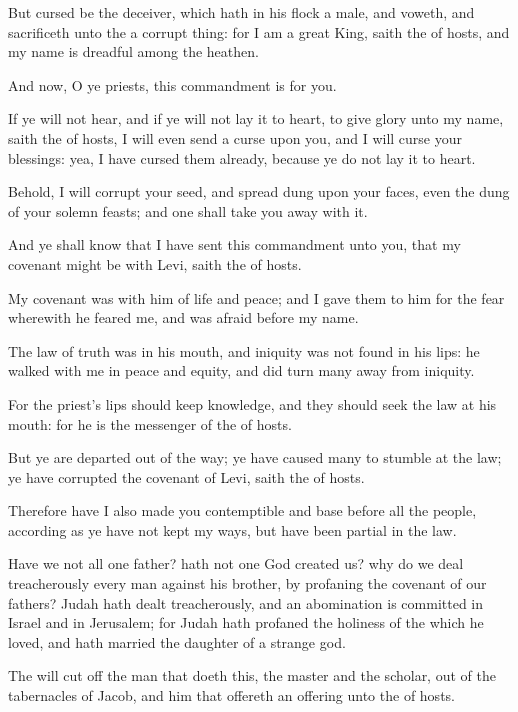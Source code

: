 \Verse But cursed be the deceiver, which hath in his flock a male, and voweth, and sacrificeth unto the \LORD a corrupt thing: for I am a great King, saith the \LORD of hosts, and my name is dreadful among the heathen.


\Chapter
\Verse And now, O ye priests, this commandment is for you.

\Verse If ye will not hear, and if ye will not lay it to heart, to give glory unto my name, saith the \LORD of hosts, I will even send a curse upon you, and I will curse your blessings: yea, I have cursed them already, because ye do not lay it to heart.

\Verse Behold, I will corrupt your seed, and spread dung upon your faces, even the dung of your solemn feasts; and one shall take you away with it.

\Verse And ye shall know that I have sent this commandment unto you, that my covenant might be with Levi, saith the \LORD of hosts.

\Verse My covenant was with him of life and peace; and I gave them to him for the fear wherewith he feared me, and was afraid before my name.

\Verse The law of truth was in his mouth, and iniquity was not found in his lips: he walked with me in peace and equity, and did turn many away from iniquity.

\Verse For the priest's lips should keep knowledge, and they should seek the law at his mouth: for he is the messenger of the \LORD of hosts.

\Verse But ye are departed out of the way; ye have caused many to stumble at the law; ye have corrupted the covenant of Levi, saith the \LORD of hosts.

\Verse Therefore have I also made you contemptible and base before all the people, according as ye have not kept my ways, but have been partial in the law.

\Verse Have we not all one father? hath not one God created us? why do we deal treacherously every man against his brother, by profaning the covenant of our fathers?  \Verse Judah hath dealt treacherously, and an abomination is committed in Israel and in Jerusalem; for Judah hath profaned the holiness of the \LORD which he loved, and hath married the daughter of a strange god.

\Verse The \LORD will cut off the man that doeth this, the master and the scholar, out of the tabernacles of Jacob, and him that offereth an offering unto the \LORD of hosts.

